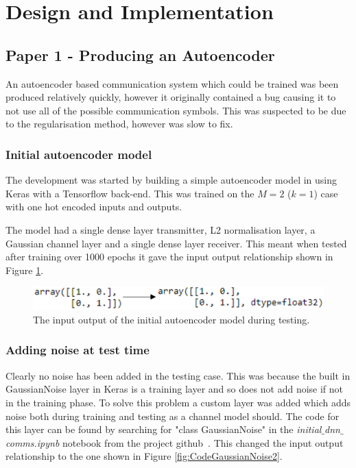 \documentclass[12pt,onecolumn,letterpaper]{article}
\newcommand{\code}{\textit}
\begin{document}
\FloatBarrier
\section{Design and Implementation}

\subsection{Paper 1 - Producing an Autoencoder}

An autoencoder based communication system which could be trained was been produced relatively quickly, however it originally contained a bug causing it to not use all of the possible communication symbols. This was suspected to be due to the regularisation method, however was slow to fix.

\subsubsection{Initial autoencoder model}

The development was started by building a simple autoencoder model in using Keras with a Tensorflow back-end. This was trained on the $M=2$ ($k=1$) case with one hot encoded inputs and outputs. 

The model had a single dense layer transmitter, L2 normalisation layer, a Gaussian channel layer and a single dense layer receiver. This meant when tested after training over 1000 epochs it gave the input output relationship shown in Figure \ref{fig:CodeInitialOutput}.

\begin{figure}[t]
   \centering
   \includegraphics[width=0.8\linewidth]{figures/initial_ae_output.png}
   \caption{The input output of the initial autoencoder model during testing. }
\label{fig:CodeInitialOutput}
\end{figure}

\subsubsection{Adding noise at test time}

Clearly no noise has been added in the testing case. This was because the built in GaussianNoise layer in Keras is a training layer and so does not add noise if not in the training phase. To solve this problem a custom layer was added which adds noise both during training and testing as a channel model should. The code for this layer can be found by searching for "class GaussianNoise" in the \code{initial$\_$dnn$\_$comms.ipynb} notebook from the project github~\cite{AwGithub}. This changed the input output relationship to the one shown in Figure \ref{fig:CodeGaussianNoise2}.
\end{document}
